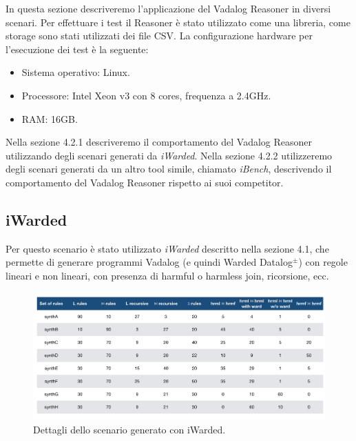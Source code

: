 In questa sezione descriveremo l'applicazione del Vadalog Reasoner in diversi scenari.\newline
Per effettuare i test il Reasoner è stato utilizzato come una libreria, come storage sono stati utilizzati dei file CSV. \newline
La configurazione hardware per l'esecuzione dei test è la seguente:
\begin{itemize}
	\item Sistema operativo: Linux.
	\item Processore: Intel Xeon v3 con 8 cores, frequenza a 2.4GHz.
	\item RAM: 16GB.
\end{itemize}
Nella sezione 4.2.1 descriveremo il comportamento del Vadalog Reasoner utilizzando degli scenari generati da \emph{iWarded}. \newline
Nella sezione 4.2.2 utilizzeremo degli scenari generati da un altro tool simile, chiamato \emph{iBench}, descrivendo il comportamento del Vadalog Reasoner rispetto ai suoi competitor. \newline

\subsection{iWarded}

Per questo scenario è stato utilizzato \emph{iWarded} descritto nella sezione 4.1, che permette di generare programmi Vadalog (e quindi Warded Datalog$^\pm$) con regole lineari e non lineari, con presenza di harmful o harmless join, ricorsione, ecc. \newline
\begin{figure}[h]
	\centering
	\includegraphics[width=0.8\linewidth]{figure/iWardedScenario}
	\caption{Dettagli dello scenario generato con iWarded.}
	\label{fig:iwarded}
\end{figure}

